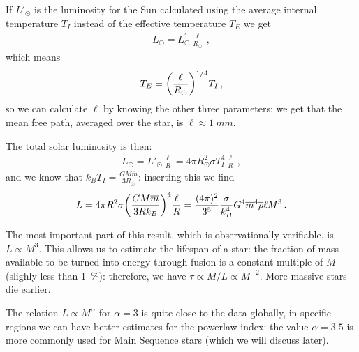 \documentclass[main.tex]{subfiles}
\begin{document}

If \(L' _{\odot}\) is the luminosity for the Sun calculated using the average internal temperature \(T_I\) instead of the effective temperature \(T_E\) we get
%
\begin{align}
  L _{\odot} = L _{\odot}^{\prime } \frac{\ell}{R _{\odot}}
\,,
\end{align}
%
which means 
%
\begin{align}
  T_E = \qty(\frac{\ell}{R _{\odot}})^{1/4} T_I
\,,
\end{align}
%
so we can calculate \(\ell\) by knowing the other three parameters:
we get that the mean free path, averaged over the star, is \(\ell \approx \SI{1}{mm}\).

The total solar luminosity is then:
%
\begin{align}
  L_{\odot} = L'_{\odot} \frac{\ell}{R} = 4 \pi R _{\odot}^2 \sigma T_I^{4} \frac{\ell}{R}
\,,
\end{align}
%
and we know that \(k_B T_I = \frac{GM \overline{m}}{3 R_{\odot}}\): inserting this we find 
%
\begin{align}
  L = 4 \pi R^2 \sigma  \qty(\frac{GM \overline{m}}{3 R k_B})^{4} \frac{\ell}{R}
  = \frac{(4 \pi )^2}{3^{5}} \frac{\sigma }{k_B^4} G^{4} \overline{m}^{4} \overline{\rho} \ell M^3  
\,.
\end{align}

The most important part of this result, which is observationally verifiable, is \(L \propto M^{3}\). 
This allows us to estimate the lifespan of a star: the fraction of mass available to be turned into energy through fusion is a constant multiple of \(M\) (slighly less than \SI{1}{\percent}): therefore, we have \(\tau \propto M/L \propto M^{-2}\). 
More massive stars die earlier.

The relation \(L \propto M^{\alpha } \) for \(\alpha = 3\) is quite close to the data globally, in specific regions we can have better estimates for the powerlaw index: the value \(\alpha = 3.5\) is more commonly used for Main Sequence stars (which we will discuss later). 
\end{document}
